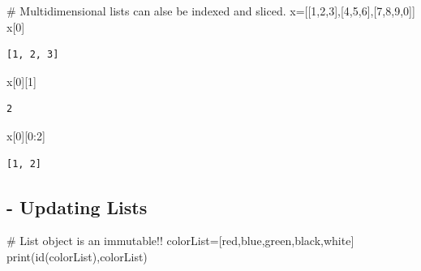 \documentclass[
  letterpaper,
  DIV=11,
  numbers=noendperiod]{scrreprt}
\newenvironment{Shaded}{\begin{snugshade}}{\end{snugshade}}
\newcommand{\BuiltInTok}[1]{\textcolor[rgb]{0.00,0.23,0.31}{#1}}
\newcommand{\CommentTok}[1]{\textcolor[rgb]{0.37,0.37,0.37}{#1}}
\newcommand{\DecValTok}[1]{\textcolor[rgb]{0.68,0.00,0.00}{#1}}
\newcommand{\NormalTok}[1]{\textcolor[rgb]{0.00,0.23,0.31}{#1}}
\newcommand{\OperatorTok}[1]{\textcolor[rgb]{0.37,0.37,0.37}{#1}}
\newcommand{\StringTok}[1]{\textcolor[rgb]{0.13,0.47,0.30}{#1}}
\begin{document}
\begin{Shaded}
\begin{Highlighting}[]
\CommentTok{\# Multidimensional lists can alse be indexed and sliced.}
\NormalTok{x}\OperatorTok{=}\NormalTok{[[}\DecValTok{1}\NormalTok{,}\DecValTok{2}\NormalTok{,}\DecValTok{3}\NormalTok{],[}\DecValTok{4}\NormalTok{,}\DecValTok{5}\NormalTok{,}\DecValTok{6}\NormalTok{],[}\DecValTok{7}\NormalTok{,}\DecValTok{8}\NormalTok{,}\DecValTok{9}\NormalTok{,}\DecValTok{0}\NormalTok{]]}
\NormalTok{x[}\DecValTok{0}\NormalTok{]}
\end{Highlighting}
\end{Shaded}

\begin{verbatim}
[1, 2, 3]
\end{verbatim}

\begin{Shaded}
\begin{Highlighting}[]
\NormalTok{x[}\DecValTok{0}\NormalTok{][}\DecValTok{1}\NormalTok{]}
\end{Highlighting}
\end{Shaded}

\begin{verbatim}
2
\end{verbatim}

\begin{Shaded}
\begin{Highlighting}[]
\NormalTok{x[}\DecValTok{0}\NormalTok{][}\DecValTok{0}\NormalTok{:}\DecValTok{2}\NormalTok{]}
\end{Highlighting}
\end{Shaded}

\begin{verbatim}
[1, 2]
\end{verbatim}

\subsection{- Updating Lists}\label{updating-lists}

\begin{Shaded}
\begin{Highlighting}[]
\CommentTok{\# List object is an immutable!!}
\NormalTok{colorList}\OperatorTok{=}\NormalTok{[}\StringTok{\textquotesingle{}red\textquotesingle{}}\NormalTok{,}\StringTok{\textquotesingle{}blue\textquotesingle{}}\NormalTok{,}\StringTok{\textquotesingle{}green\textquotesingle{}}\NormalTok{,}\StringTok{\textquotesingle{}black\textquotesingle{}}\NormalTok{,}\StringTok{\textquotesingle{}white\textquotesingle{}}\NormalTok{]}
\BuiltInTok{print}\NormalTok{(}\BuiltInTok{id}\NormalTok{(colorList),colorList)}
\end{Highlighting}
\end{Shaded}
\end{document}
